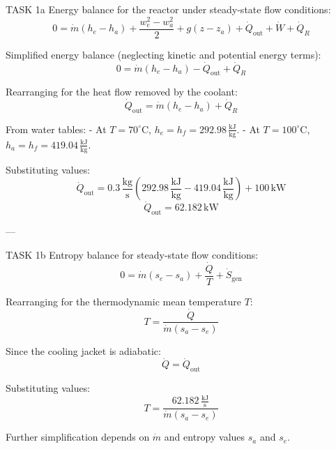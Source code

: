 TASK 1a  
Energy balance for the reactor under steady-state flow conditions:  
\[
0 = \dot{m} \left( h_e - h_a \right) + \frac{w_e^2 - w_a^2}{2} + g \left( z - z_a \right) + \dot{Q}_{\text{out}} + \dot{W} + \dot{Q}_R
\]  

Simplified energy balance (neglecting kinetic and potential energy terms):  
\[
0 = \dot{m} \left( h_e - h_a \right) - \dot{Q}_{\text{out}} + \dot{Q}_R
\]  

Rearranging for the heat flow removed by the coolant:  
\[
\dot{Q}_{\text{out}} = \dot{m} \left( h_e - h_a \right) + \dot{Q}_R
\]  

From water tables:  
- At \( T = 70^\circ\text{C} \), \( h_e = h_f = 292.98 \, \frac{\text{kJ}}{\text{kg}} \).  
- At \( T = 100^\circ\text{C} \), \( h_a = h_f = 419.04 \, \frac{\text{kJ}}{\text{kg}} \).  

Substituting values:  
\[
\dot{Q}_{\text{out}} = 0.3 \, \frac{\text{kg}}{\text{s}} \left( 292.98 \, \frac{\text{kJ}}{\text{kg}} - 419.04 \, \frac{\text{kJ}}{\text{kg}} \right) + 100 \, \text{kW}
\]  
\[
\dot{Q}_{\text{out}} = 62.182 \, \text{kW}
\]  

---

TASK 1b  
Entropy balance for steady-state flow conditions:  
\[
0 = \dot{m} \left( s_e - s_a \right) + \frac{\dot{Q}}{T} + \dot{S}_{\text{gen}}
\]  

Rearranging for the thermodynamic mean temperature \( T \):  
\[
T = \frac{\dot{Q}}{\dot{m} \left( s_a - s_e \right)}
\]  

Since the cooling jacket is adiabatic:  
\[
\dot{Q} = \dot{Q}_{\text{out}}
\]  

Substituting values:  
\[
T = \frac{62.182 \, \frac{\text{kJ}}{\text{s}}}{\dot{m} \left( s_a - s_e \right)}
\]  

Further simplification depends on \( \dot{m} \) and entropy values \( s_a \) and \( s_e \).